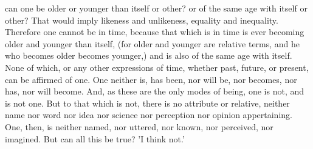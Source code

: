\documentclass[11pt,letter]{article}
\begin{document}
can one be older or younger than itself or other? or of the same age with itself or other? That would imply likeness and unlikeness, equality and inequality. Therefore one cannot be in time, because that which is in time is ever becoming older and younger than itself, (for older and younger are relative terms, and he who becomes older becomes younger,) and is also of the same age with itself. None of which, or any other expressions of time, whether past, future, or present, can be affirmed of one. One neither is, has been, nor will be, nor becomes, nor has, nor will become. And, as these are the only modes of being, one is not, and is not one. But to that which is not, there is no attribute or relative, neither name nor word nor idea nor science nor perception nor opinion appertaining. One, then, is neither named, nor uttered, nor known, nor perceived, nor imagined. But can all this be true? 'I think not.'
\end{document}
